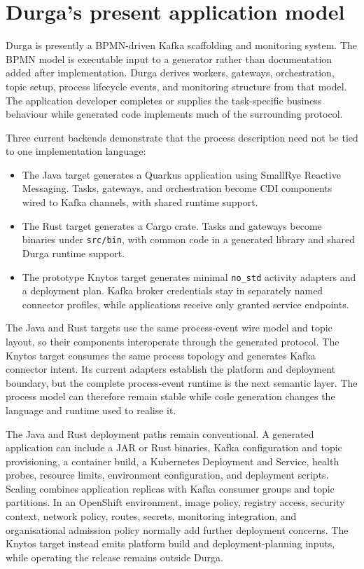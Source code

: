 \section{Durga's present application model}

Durga is presently a BPMN-driven Kafka scaffolding and monitoring system. The
BPMN model is executable input to a generator rather than documentation added
after implementation. Durga derives workers, gateways, orchestration, topic
setup, process lifecycle events, and monitoring structure from that model. The
application developer completes or supplies the task-specific business
behaviour while generated code implements much of the surrounding protocol.

Three current backends demonstrate that the process description need not be tied
to one implementation language:

\begin{itemize}
    \item The Java target generates a Quarkus application using SmallRye
        Reactive Messaging. Tasks, gateways, and orchestration become CDI
        components wired to Kafka channels, with shared runtime support.

    \item The Rust target generates a Cargo crate. Tasks and gateways become
        binaries under \texttt{src/bin}, with common code in a generated
        library and shared Durga runtime support.

    \item The prototype Knytos target generates minimal \texttt{no\_std}
        activity adapters and a deployment plan. Kafka broker credentials stay
        in separately named connector profiles, while applications receive only
        granted service endpoints.
\end{itemize}

The Java and Rust targets use the same process-event wire model and topic
layout, so their components interoperate through the generated protocol. The
Knytos target consumes the same process topology and generates Kafka
connector intent. Its current adapters establish the platform and deployment
boundary, but the complete process-event runtime is the next semantic layer. The
process model can therefore remain stable while code generation changes the
language and runtime used to realise it.

The Java and Rust deployment paths remain conventional. A generated application
can include a JAR or Rust binaries, Kafka configuration and topic provisioning,
a container build, a Kubernetes Deployment and Service, health probes, resource
limits, environment configuration, and deployment scripts. Scaling combines
application replicas with Kafka consumer groups and topic partitions. In an
OpenShift environment, image policy, registry access, security context,
network policy, routes, secrets, monitoring integration, and organisational
admission policy normally add further deployment concerns. The Knytos
target instead emits platform build and deployment-planning inputs, while operating
the release remains outside Durga.


